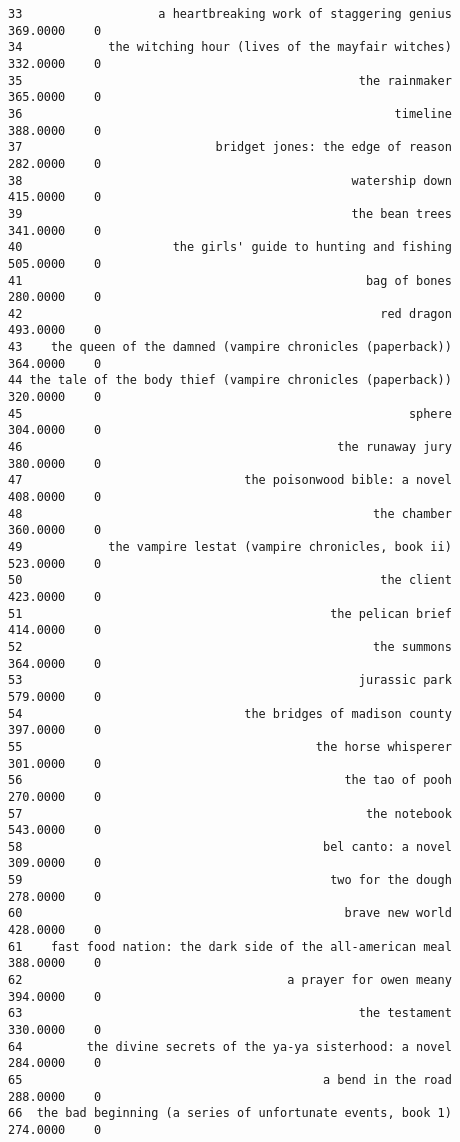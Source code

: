 \documentclass[
]{report}
\begin{document}
\begin{verbatim}
33                   a heartbreaking work of staggering genius  369.0000    0
34            the witching hour (lives of the mayfair witches)  332.0000    0
35                                               the rainmaker  365.0000    0
36                                                    timeline  388.0000    0
37                           bridget jones: the edge of reason  282.0000    0
38                                              watership down  415.0000    0
39                                              the bean trees  341.0000    0
40                     the girls' guide to hunting and fishing  505.0000    0
41                                                bag of bones  280.0000    0
42                                                  red dragon  493.0000    0
43    the queen of the damned (vampire chronicles (paperback))  364.0000    0
44 the tale of the body thief (vampire chronicles (paperback))  320.0000    0
45                                                      sphere  304.0000    0
46                                            the runaway jury  380.0000    0
47                               the poisonwood bible: a novel  408.0000    0
48                                                 the chamber  360.0000    0
49            the vampire lestat (vampire chronicles, book ii)  523.0000    0
50                                                  the client  423.0000    0
51                                           the pelican brief  414.0000    0
52                                                 the summons  364.0000    0
53                                               jurassic park  579.0000    0
54                               the bridges of madison county  397.0000    0
55                                         the horse whisperer  301.0000    0
56                                             the tao of pooh  270.0000    0
57                                                the notebook  543.0000    0
58                                          bel canto: a novel  309.0000    0
59                                           two for the dough  278.0000    0
60                                             brave new world  428.0000    0
61    fast food nation: the dark side of the all-american meal  388.0000    0
62                                     a prayer for owen meany  394.0000    0
63                                               the testament  330.0000    0
64         the divine secrets of the ya-ya sisterhood: a novel  284.0000    0
65                                          a bend in the road  288.0000    0
66  the bad beginning (a series of unfortunate events, book 1)  274.0000    0

\end{verbatim}
\end{document}
